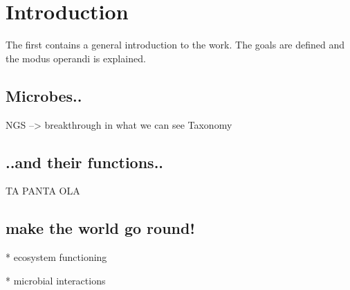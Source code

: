 \chapter{Introduction}
\label{cha:intro}
The first contains a general introduction to the work. The goals are
defined and the modus operandi is explained.



\section{Microbes..}

NGS --> breakthrough in what we can see
Taxonomy


\section{..and their functions..}

TA PANTA OLA

\section{make the world go round!}

* ecosystem functioning

* microbial interactions 



